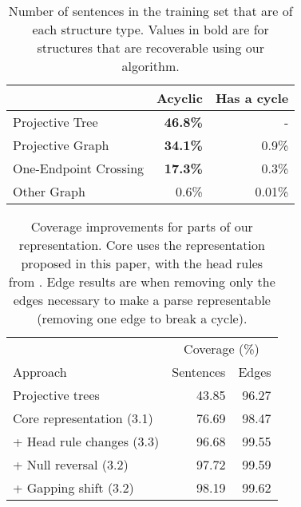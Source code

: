 \begin{table}
  \centering
  \begin{tabular}{|lrr|}
    \hline
      & Acyclic & Has a cycle \\
    \hline
    \hline
    Projective Tree & \textbf{46.8\%} & - \\
    Projective Graph & \textbf{34.1\%} & 0.9\% \\
    One-Endpoint Crossing & \textbf{17.3\%} & 0.3\% \\
    Other Graph & 0.6\% & 0.01\% \\
    \hline
  \end{tabular}
  \vspace{-4mm}
  \caption{\label{tab:structures}
    Number of sentences in the training set that are of each structure type.
    Values in bold are for structures that are recoverable using our algorithm.
  }
\end{table}

\begin{table}
\centering
  \vspace{2mm}
  \begin{tabular}{|lrr|}
    \hline
    & \multicolumn{2}{c}{Coverage (\%)} \\
    Approach & Sentences & Edges \\
    \hline
    \hline
    Projective trees & 43.85 & 96.27 \\
    Core representation (3.1) & 76.69 & 98.47 \\
    + Head rule changes (3.3) & 96.68 & 99.55 \\
    + Null reversal (3.2) & 97.72 & 99.59 \\
    + Gapping shift (3.2) & 98.19 & 99.62 \\
    \hline
  \end{tabular}
  \vspace{-2mm}
  \caption{\label{tab:coverage}
    Coverage improvements for parts of our representation.
    Core uses the representation proposed in this paper, with the head rules from \textcite{cck}.
    Edge results are when removing only the edges necessary to make a parse representable (\myeg removing one edge to break a cycle).
  }
\end{table}

